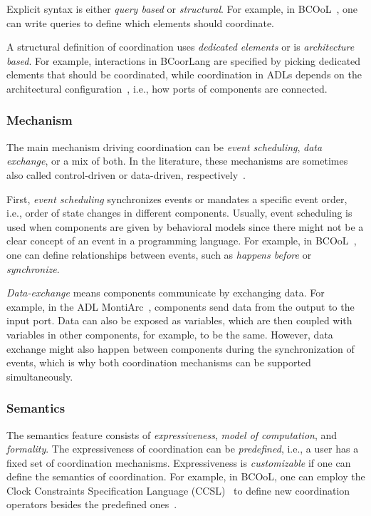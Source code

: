 \documentclass[runningheads]{llncs}
\begin{document}
Explicit syntax is either \textit{query based} or \textit{structural}.
For example, in BCOoL~\cite{varalarsenBCOolBehavioralCoordination2016,varalarsenBehavioralCoordinationOperator2015}, one can write queries to define which elements should coordinate.

A structural definition of coordination uses \textit{dedicated elements} or is \textit{architecture based}.
For example, interactions in BCoorLang are specified by picking dedicated elements that should be coordinated, while coordination in ADLs depends on the architectural configuration~\cite{medvidovicClassificationComparisonFramework2000}, i.e., how ports of components are connected.

\subsubsection{Mechanism} The main mechanism driving coordination can be \textit{event scheduling}, \textit{data exchange}, or a mix of both.
In the literature, these mechanisms are sometimes also called control-driven or data-driven, respectively~\cite{papadopoulosCoordinationModelsLanguages1998,varalarsenBCOolBehavioralCoordination2016}.

First, \textit{event scheduling} synchronizes events or mandates a specific event order, i.e., order of state changes in different components.
Usually, event scheduling is used when components are given by behavioral models since there might not be a clear concept of an event in a programming language.
For example, in BCOoL~\cite{varalarsenBehavioralCoordinationOperator2015}, one can define relationships between events, such as \textit{happens before} or \textit{synchronize}.

\textit{Data-exchange} means components communicate by exchanging data.
For example, in the ADL MontiArc~\cite{haberMontiArcArchitecturalModeling2014}, components send data from the output to the input port.
Data can also be exposed as variables, which are then coupled with variables in other components, for example, to be the same.
However, data exchange might also happen between components during the synchronization of events, which is why both coordination mechanisms can be supported simultaneously.

\subsubsection{Semantics} The semantics feature consists of \textit{expressiveness}, \textit{model of computation}, and \textit{formality}.
The expressiveness of coordination can be \textit{predefined}, i.e., a user has a fixed set of coordination mechanisms.
Expressiveness is \textit{customizable} if one can define the semantics of coordination.
For example, in BCOoL, one can employ the Clock Constraints Specification Language (CCSL)~\cite{andreSyntaxSemanticsClock2009} to define new coordination operators besides the predefined ones~\cite{varalarsenBCOolBehavioralCoordination2016,varalarsenBehavioralCoordinationOperator2015}.
\end{document}
